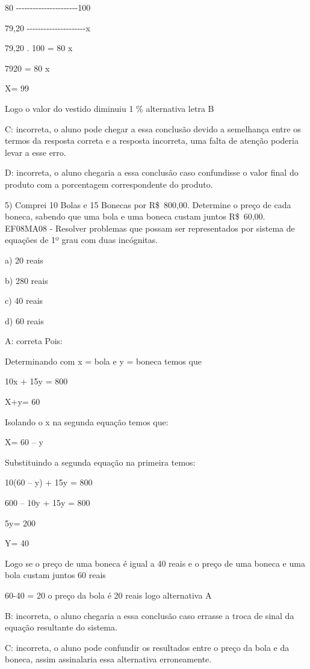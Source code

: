 {80 -\/-\/-\/-\/-\/-\/-\/-\/-\/-\/-\/-\/-\/-\/-\/-\/-\/-\/-\/-\/-\/-100

79,20 -\/-\/-\/-\/-\/-\/-\/-\/-\/-\/-\/-\/-\/-\/-\/-\/-\/-\/-\/-\/-x

79,20 . 100 = 80 x

7920 = 80 x

X= 99

Logo o valor do vestido diminuiu 1 \% alternativa letra B

C: incorreta, o aluno pode chegar a essa conclusão devido a semelhança
entre os termos da resposta correta e a resposta incorreta, uma falta de
atenção poderia levar a esse erro.

D: incorreta, o aluno chegaria a essa conclusão caso confundisse o valor
final do produto com a porcentagem correspondente do produto.

5) Comprei 10 Bolas e 15 Bonecas por R\$~800,00. Determine o preço de
cada boneca, sabendo que uma bola e uma boneca custam juntos R\$~60,00.
EF08MA08 - Resolver problemas que possam ser representados por sistema
de equações de 1º grau com duas incógnitas.

a) 20 reais

b) 280 reais

c) 40 reais

d) 60 reais

A: correta Pois:

Determinando com x = bola e y = boneca temos que

10x + 15y = 800

X+y= 60

Isolando o x na segunda equação temos que:

X= 60 -- y

Substituindo a segunda equação na primeira temos:

10(60 -- y) + 15y = 800

600 -- 10y + 15y = 800

5y= 200

Y= 40

Logo se o preço de uma boneca é igual a 40 reais e o preço de uma boneca
e uma bola custam juntos 60 reais

60-40 = 20 o preço da bola é 20 reais logo alternativa A

B: incorreta, o aluno chegaria a essa conclusão caso errasse a troca de
sinal da equação resultante do sistema.

C: incorreta, o aluno pode confundir os resultados entre o preço da bola
e da boneca, assim assinalaria essa alternativa erroneamente.

}
